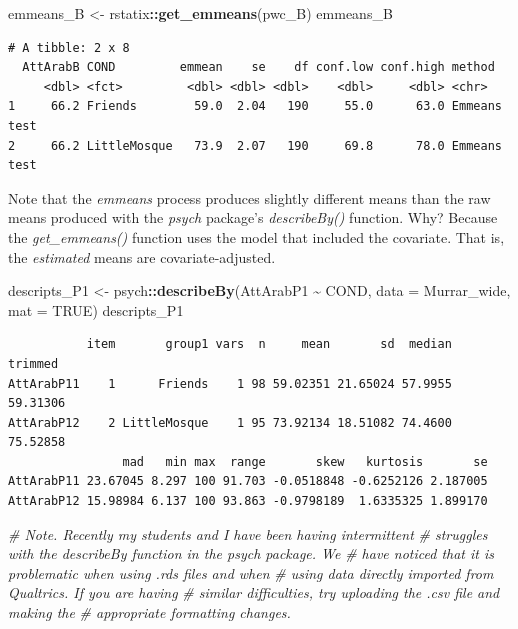 \documentclass[
  11pt,
]{book}
\newenvironment{Shaded}{\begin{snugshade}}{\end{snugshade}}
\newcommand{\AttributeTok}[1]{\textcolor[rgb]{0.27,0.27,0.27}{#1}}
\newcommand{\CommentTok}[1]{\textcolor[rgb]{0.37,0.37,0.37}{\textit{#1}}}
\newcommand{\ConstantTok}[1]{\textcolor[rgb]{0.37,0.37,0.37}{#1}}
\newcommand{\FunctionTok}[1]{\textcolor[rgb]{0.27,0.27,0.27}{\textbf{#1}}}
\newcommand{\NormalTok}[1]{#1}
\newcommand{\OtherTok}[1]{\textcolor[rgb]{0.37,0.37,0.37}{#1}}
\newcommand{\SpecialCharTok}[1]{\textcolor[rgb]{0.43,0.43,0.43}{\textbf{#1}}}
\begin{document}
\begin{Shaded}
\begin{Highlighting}[]
\NormalTok{emmeans\_B }\OtherTok{\textless{}{-}}\NormalTok{ rstatix}\SpecialCharTok{::}\FunctionTok{get\_emmeans}\NormalTok{(pwc\_B)}
\NormalTok{emmeans\_B}
\end{Highlighting}
\end{Shaded}

\begin{verbatim}
# A tibble: 2 x 8
  AttArabB COND         emmean    se    df conf.low conf.high method      
     <dbl> <fct>         <dbl> <dbl> <dbl>    <dbl>     <dbl> <chr>       
1     66.2 Friends        59.0  2.04   190     55.0      63.0 Emmeans test
2     66.2 LittleMosque   73.9  2.07   190     69.8      78.0 Emmeans test
\end{verbatim}

Note that the \emph{emmeans} process produces slightly different means than the raw means produced with the \emph{psych} package's \emph{describeBy()} function. Why? Because the \emph{get\_emmeans()} function uses the model that included the covariate. That is, the \emph{estimated} means are covariate-adjusted.

\begin{Shaded}
\begin{Highlighting}[]
\NormalTok{descripts\_P1 }\OtherTok{\textless{}{-}}\NormalTok{ psych}\SpecialCharTok{::}\FunctionTok{describeBy}\NormalTok{(AttArabP1 }\SpecialCharTok{\textasciitilde{}}\NormalTok{ COND, }\AttributeTok{data =}\NormalTok{ Murrar\_wide,}
    \AttributeTok{mat =} \ConstantTok{TRUE}\NormalTok{)}
\NormalTok{descripts\_P1}
\end{Highlighting}
\end{Shaded}

\begin{verbatim}
           item       group1 vars  n     mean       sd  median  trimmed
AttArabP11    1      Friends    1 98 59.02351 21.65024 57.9955 59.31306
AttArabP12    2 LittleMosque    1 95 73.92134 18.51082 74.4600 75.52858
                mad   min max  range       skew   kurtosis       se
AttArabP11 23.67045 8.297 100 91.703 -0.0518848 -0.6252126 2.187005
AttArabP12 15.98984 6.137 100 93.863 -0.9798189  1.6335325 1.899170
\end{verbatim}

\begin{Shaded}
\begin{Highlighting}[]
\CommentTok{\# Note. Recently my students and I have been having intermittent}
\CommentTok{\# struggles with the describeBy function in the psych package. We}
\CommentTok{\# have noticed that it is problematic when using .rds files and when}
\CommentTok{\# using data directly imported from Qualtrics. If you are having}
\CommentTok{\# similar difficulties, try uploading the .csv file and making the}
\CommentTok{\# appropriate formatting changes.}
\end{Highlighting}
\end{Shaded}
\end{document}
